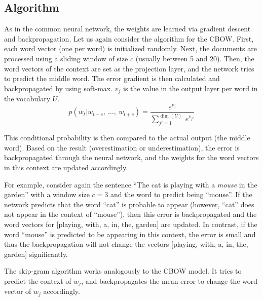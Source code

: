 \subsection{Algorithm}

As in the common neural network, the weights are learned via gradient descent and backpropagation. Let us again consider the algorithm for the CBOW\@. First, each word vector (one per word) is initialized randomly. Next, the documents are processed using a sliding window of size $c$ (usually between 5 and 20). Then, the word vectors of the context are set as the projection layer, and the network tries to predict the middle word. The error gradient is then calculated and backpropagated by using soft-max. $v_j$ is the value in the output layer per word in the vocabulary $U$.
\begin{displaymath}
p(w_{t} | w_{t - c},\ \ldots,\ w_{t + c}) = \frac{e^{v_{j}}}{\sum_{j'=1}^{\dim(U)}\ e^{v_{j'}}}
\end{displaymath}

This conditional probability is then compared to the actual output (the middle word). Based on the result (overestimation or underestimation), the error is backpropagated through the neural network, and the weights for the word vectors in this context are updated accordingly.

For example, consider again the sentence ``The cat is playing with a \emph{mouse} in the garden'' with a window size $c=3$ and the word to predict being ``mouse''. If the network predicts that the word ``cat'' is probable to appear (however, ``cat'' does not appear in the context of ``mouse''), then this error is backpropagated and the word vectors for [playing, with, a, in, the, garden] are updated. In contrast, if the word ``mouse'' is predicted to be appearing in this context, the error is small and thus the backpropagation will not change the vectors [playing, with, a, in, the, garden] significantly.

The skip-gram algorithm works analogously to the CBOW model. It tries to predict the context of $w_{j}$, and backpropagates the mean error to change the word vector of $w_{j}$ accordingly.

